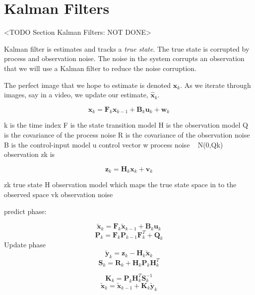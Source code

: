 \section{Kalman Filters}
	<TODO Section Kalman Filters: NOT DONE>

Kalman filter is estimates and tracks a \emph{true state}. The true state is corrupted by process and observation noise. The noise in the system corrupts an observation that we will use a Kalman filter to reduce the noise corruption. 

The perfect image that we hope to estimate is denoted $\mathbf{x}_k$. As we iterate through images, say in a video, we update our estimate, $\hat{\mathbf{x}}_k$.
	
\begin{equation}
\mathbf{x}_k = \mathbf{F}_k\mathbf{x}_{k-1} + \mathbf{B}_k\mathbf{u}_{k} + \mathbf{w}_k
\end{equation}

k is the time index
F is the state transition model
H is the observation model
Q is the covariance of the process noise
R is the covariance of the observation noise
B is the control-input model
u control vector
w process noise ~ N(0,Qk)
observation zk is

\begin{equation}
\mathbf{z}_k = \mathbf{H}_k\mathbf{x}_{k} + \mathbf{v}_k
\end{equation}

zk true state
H observation model which maps the true state space in to the observed space
vk observation noise

predict phase:

\begin{equation}
\tilde{\mathbf{x}}_k = \mathbf{F}_k\tilde{\mathbf{x}}_{k-1} + \mathbf{B}_k\mathbf{u}_k
\end{equation}
\begin{equation}
\mathbf{P}_k = \mathbf{F}_k\mathbf{P}_{k-1}\mathbf{F}_k^T + \mathbf{Q}_k
\end{equation}
Update phase
\begin{equation}
\tilde{\mathbf{y}}_k = \mathbf{z}_k - \mathbf{H}_{k}\tilde{\mathbf{x}}_k
\end{equation}
\begin{equation}
\mathbf{S}_k = \mathbf{R}_k + \mathbf{H}_{k}\mathbf{P}_k\mathbf{H}_{k}^T
\end{equation}

\begin{equation}
\mathbf{K}_k = \mathbf{P}_k\mathbf{H}_{k}^T\mathbf{S}_k^{-1}
\end{equation}
\begin{equation}
\tilde{\mathbf{x}}_k = \tilde{\mathbf{x}}_{k-1} +  \mathbf{K}_k\tilde{\mathbf{y}}_{k}
\end{equation}

